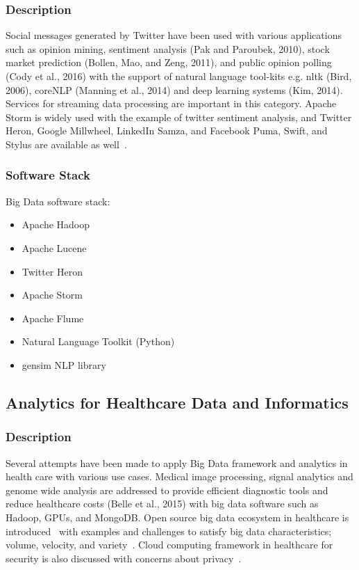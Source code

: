 \documentclass[9pt,twocolumn,twoside]{styles/osajnl}
\begin{document}
\subsubsection{Description}

Social messages generated by Twitter have been used with various
applications such as opinion mining, sentiment analysis (Pak and
Paroubek, 2010), stock market prediction (Bollen, Mao, and Zeng,
2011), and public opinion polling (Cody et al., 2016) with the support
of natural language tool-kits e.g. nltk (Bird, 2006), coreNLP (Manning
et al., 2014) and deep learning systems (Kim, 2014). Services for
streaming data processing are important in this category. Apache Storm
is widely used with the example of twitter sentiment analysis, and
Twitter Heron, Google Millwheel, LinkedIn Samza, and Facebook Puma,
Swift, and Stylus are available as well~\cite{chen2016realtime}.

\subsubsection{Software Stack}

Big Data software stack:

\begin{itemize}
\item Apache Hadoop
\item Apache Lucene
\item Twitter Heron
\item Apache Storm
\item Apache Flume
\item Natural Language Toolkit (Python)
\item gensim NLP library
\end{itemize}



\subsection{Analytics for Healthcare Data and Informatics}

\subsubsection{Description}

Several attempts have been made to apply Big Data framework and
analytics in health care with various use cases. Medical image
processing, signal analytics and genome wide analysis are addressed to
provide efficient diagnostic tools and reduce healthcare costs (Belle
et al., 2015) with big data software such as Hadoop, GPUs, and
MongoDB. Open source big data ecosystem in healthcare is
introduced~\cite{raghupathi2014big} with examples and challenges to satisfy big
data characteristics; volume, velocity, and
variety~\cite{zikopoulos2011understanding}. Cloud computing framework in
healthcare for security is also discussed with concerns about
privacy~\cite{stantchev2014cloud}.
\end{document}
